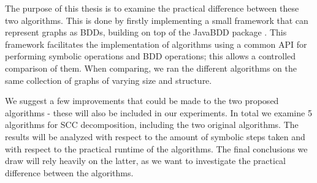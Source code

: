 \documentclass[../master/master.tex]{subfiles}
\begin{document}
The purpose of this thesis is to examine the practical difference between these two algorithms. This is done by firstly implementing a small framework that can represent graphs as BDDs, building on top of the JavaBDD package \cite{whaley}. This framework facilitates the implementation of algorithms using a common API for performing symbolic operations and BDD operations; this allows a controlled comparison of them. 
When comparing, we ran the different algorithms on the same collection of graphs of varying size and structure.

We suggest a few improvements that could be made to the two proposed algorithms - these will also be included in our experiments. In total we examine 5 algorithms for SCC decomposition, including the two original algorithms. The results will be analyzed with respect to the amount of symbolic steps taken and with respect to the practical runtime of the algorithms. The final conclusions we draw will rely heavily on the latter, as we want to investigate the practical difference between the algorithms.
\end{document}
